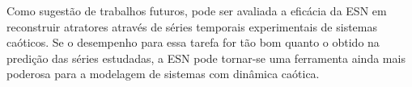 \documentclass[a4paper, 12pt]{article}
\begin{document}
Como sugestão de trabalhos futuros, pode ser avaliada a eficácia da ESN em reconstruir atratores através de séries temporais experimentais de sistemas caóticos. Se o desempenho para essa tarefa for tão bom quanto o obtido na predição das séries estudadas, a ESN pode tornar-se uma ferramenta ainda mais poderosa para a modelagem de sistemas com dinâmica caótica.



{\footnotesize }

\end{document}

